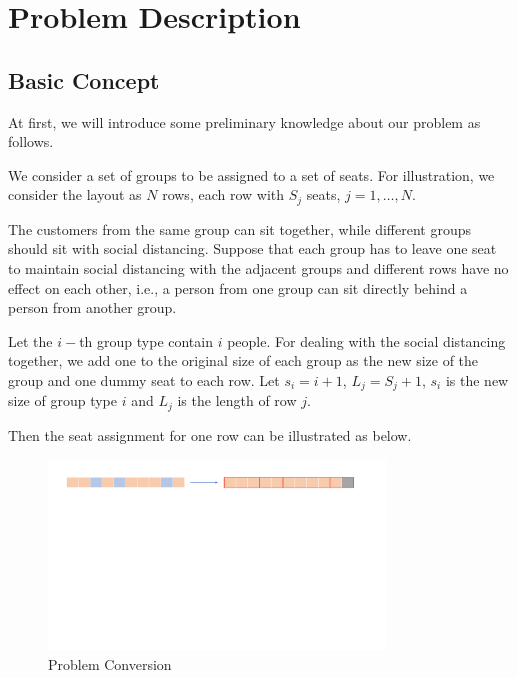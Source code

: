 \section{Problem Description}

\subsection{Basic Concept}

At first, we will introduce some preliminary knowledge about our problem as follows.

We consider a set of groups to be assigned to a set of seats. For illustration, we consider the layout as $N$ rows, each row with $S_{j}$ seats, $j = 1, \ldots, N$. 


The customers from the same group can sit together, while different groups should sit with social distancing. Suppose that each group has to leave one seat to maintain social distancing with the adjacent groups and different rows have no effect on each other, i.e., a person from one group can sit directly behind a person from another group.

Let the $i-$th group type contain $i$ people. For dealing with the social distancing together, we add one to the original size of each group as the new size of the group and one dummy seat to each row. Let $s_{i} = i + 1$, $L_{j} = S_{j} +1$, $s_{i}$ is the new size of group type $i$ and $L_{j}$ is the length of row $j$.

Then the seat assignment for one row can be illustrated as below. 

\begin{figure}[ht]
    \centering
    \includegraphics[width = 0.8\textwidth]{./Figures/dummy_seat.pdf}
    \caption{Problem Conversion}
\end{figure}

